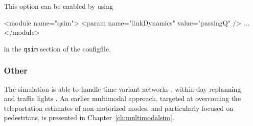 This option can be enabled by using
\begin{xml}
<module name="qsim">
   <param name="linkDynamics" value="passingQ" />
   ...
</module>
\end{xml}
in the \lstinline{qsim} section of the \gls{configfile}.


\subsubsection{Other}

The simulation is able to handle time-variant networks \citep{LaemmelGretherNagel2009TimeDependentNetworks}, within-day replanning \citep[][see Chapter~\ref{ch:withinday}]{Dobler_TechRep_IVT_2009} and traffic lights \citep[][see Chapter~\ref{ch:signalslanes}]{Neumann2008DA,GretherNeumannNagel2011TrafficLightsMatsim,GretherNeumannNagel2012SignalsQueueModelABMTrans}.
%
%
An earlier \gls{multimodal} approach, targeted at overcoming the \gls{teleportation} estimates of non-motorized modes, and particularly focused on pedestrians, is presented in Chapter~\ref{ch:multimodalsim}.

 


